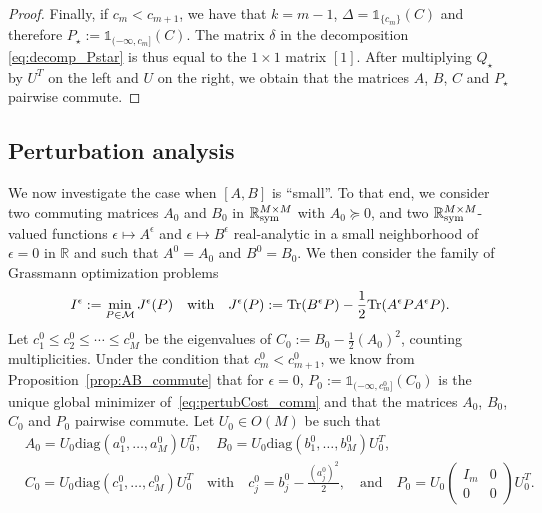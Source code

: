 \documentclass{article}
\def\R{\mathbb R}
\newcommand{\tr}{{\rm Tr}}
\newcommand{\1}{{\mathds 1}}
\begin{document}
\begin{proof}
\medskip

\noindent
Finally, if $c_m < c_{m+1}$, we have that $k=m-1$, $\Delta = \1_{\{c_m\}}(C)$ and therefore $P_\star:=\1_{(-\infty,c_m]}(C)$. The matrix $\delta$ in the decomposition \eqref{eq:decomp_Pstar} is thus equal to the $1 \times 1$ matrix $[1]$. After multiplying $Q_\star$ by $U^T$ on the left and $U$ on the right, we obtain that the matrices $A$, $B$, $C$ and $P_\star$ pairwise commute.
\end{proof}



\subsection{Perturbation analysis}
\label{sec:perturbation}

We now investigate the case when $[A,B]$ is ``small''. To that end, we consider two commuting matrices $A_0$ and $B_0$ in $\R^{M \times M}_{\rm sym}$ with $A_0 \succeq 0$, and two $\R^{M \times M}_{\rm sym}$-valued functions $\epsilon \mapsto A^\epsilon$ and  $\epsilon \mapsto B^\epsilon$ real-analytic in a small neighborhood of $\epsilon=0$ in $\R$ and such that $A^0=A_0$ and $B^0=B_0$. We then consider the family of Grassmann optimization problems
\begin{equation} \label{eq:pertubCost_comm}
I^\epsilon := \min_{P \in \mathcal M} J^\epsilon(P) \quad \mbox{with} \quad J^\epsilon(P):= \tr(B^\epsilon P) - \frac 12 \tr(A^\epsilon P A^\epsilon P).
\end{equation}
Let $c_1^0 \le c_2^0 \le \cdots \le c_M^0$ be the eigenvalues of $C_0:=B_0-\frac 12 (A_0)^2$, counting multiplicities. Under the condition that $c_m^0 < c_{m+1}^0$,
we know from Proposition~\ref{prop:AB_commute} that for $\epsilon=0$, $P_0:=\1_{(-\infty,c_m^0]}(C_0)$ is the unique global minimizer of~\eqref{eq:pertubCost_comm} and that the matrices $A_0$, $B_0$, $C_0$ and $P_0$ pairwise commute. Let $U_0 \in O(M)$ be such that
\begin{align*}
& A_0 = U_0\text{diag}(a_{1}^0, \dots, a_{M}^0) U_0^T, \quad B_0 = U_0\text{diag}(b_{1}^0, \dots, b_{M}^0) U_0^T, \\
 & C_0 = U_0\text{diag}(c_{1}^0, \dots, c_{M}^0)U_0^T \quad \mbox{with} \quad c_j^0 = b_j^0-\frac{(a_j^0)^2}2, \quad  \mbox{and} \quad P_0 = U_0 \begin{pmatrix} I_m & 0 \\ 0 & 0 \end{pmatrix} U_0^T.
\end{align*}
\end{document}
